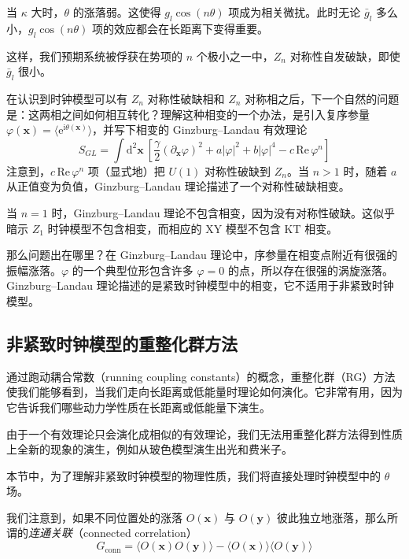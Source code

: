 当 $\kappa$ 大时，$\theta$ 的涨落弱。这使得 $g_{l}\cos(n\theta)$ 项成为相关微扰。此时无论 $\bar{g}_{l}$ 多么小，$g_{l}\cos(n\theta)$ 项的效应都会在长距离下变得重要。

这样，我们预期系统被俘获在势项的 $n$ 个极小之一中，$Z_{n}$ 对称性自发破缺，即使 $\bar{g}_{l}$ 很小。

在认识到时钟模型可以有 $Z_{n}$ 对称性破缺相和 $Z_{n}$ 对称相之后，下一个自然的问题是：这两相之间如何相互转化？理解这种相变的一个办法，是引入复序参量 $\varphi(\pmb{x}) = \langle \mathrm{e}^{\mathrm{i}\theta(\pmb{x})}\rangle$，并写下相变的 Ginzburg--Landau 有效理论
\begin{equation*}
S_{GL} = \int \mathrm{d}^{2}\pmb{x}\ \left[ \frac{\gamma}{2}(\partial_{\pmb{x}}\varphi)^{2} + a|\varphi|^{2} + b|\varphi|^{4} - c\,\mathrm{Re}\,\varphi^{n} \right]
\tag{3.5.7}
\end{equation*}
注意到，$c\,\mathrm{Re}\,\varphi^{n}$ 项（显式地）把 $U(1)$ 对称性破缺到 $Z_{n}$。当 $n > 1$ 时，随着 $a$ 从正值变为负值，Ginzburg--Landau 理论描述了一个对称性破缺相变。

当 $n = 1$ 时，Ginzburg--Landau 理论不包含相变，因为没有对称性破缺。这似乎暗示 $Z_{1}$ 时钟模型不包含相变，而相应的 XY 模型不包含 KT 相变。

那么问题出在哪里？在 Ginzburg--Landau 理论中，序参量在相变点附近有很强的振幅涨落。$\varphi$ 的一个典型位形包含许多 $\varphi = 0$ 的点，所以存在很强的涡旋涨落。Ginzburg--Landau 理论描述的是紧致时钟模型中的相变，它不适用于非紧致时钟模型。

\subsection{非紧致时钟模型的重整化群方法}
\begin{keypoints}
\item 通过跑动耦合常数（running coupling constants）的概念，重整化群（RG）方法使我们能够看到，当我们走向长距离或低能量时理论如何演化。它非常有用，因为它告诉我们哪些动力学性质在长距离或低能量下演生。
\item 由于一个有效理论只会演化成相似的有效理论，我们无法用重整化群方法得到性质上全新的现象的演生，例如从玻色模型演生出光和费米子。
\end{keypoints}

本节中，为了理解非紧致时钟模型的物理性质，我们将直接处理时钟模型中的 $\theta$ 场。

我们注意到，如果不同位置处的涨落 $O(\pmb{x})$ 与 $O(\pmb{y})$ 彼此独立地涨落，那么所谓的\emph{连通关联}（connected correlation）
\begin{equation*}
G_{\mathrm{conn}} = \langle O(\pmb{x})O(\pmb{y})\rangle - \langle O(\pmb{x})\rangle\langle O(\pmb{y})\rangle
\end{equation*}

